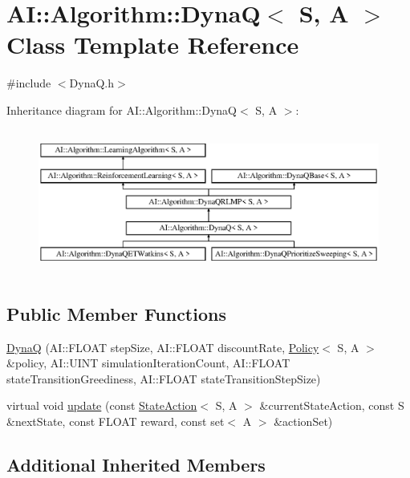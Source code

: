 \hypertarget{classAI_1_1Algorithm_1_1DynaQ}{\section{A\-I\-:\-:Algorithm\-:\-:Dyna\-Q$<$ S, A $>$ Class Template Reference}
\label{classAI_1_1Algorithm_1_1DynaQ}
}


{\ttfamily \#include $<$Dyna\-Q.\-h$>$}

Inheritance diagram for A\-I\-:\-:Algorithm\-:\-:Dyna\-Q$<$ S, A $>$\-:\begin{figure}[H]
\begin{center}
\leavevmode
\includegraphics[height=4.794520cm]{classAI_1_1Algorithm_1_1DynaQ}
\end{center}
\end{figure}
\subsection*{Public Member Functions}
\begin{DoxyCompactItemize}
\item 
\hyperlink{classAI_1_1Algorithm_1_1DynaQ_a7a25f397835208cde0c975733873b76d}{Dyna\-Q} (A\-I\-::\-F\-L\-O\-A\-T step\-Size, A\-I\-::\-F\-L\-O\-A\-T discount\-Rate, \hyperlink{classAI_1_1Algorithm_1_1Policy}{Policy}$<$ S, A $>$ \&policy, A\-I\-::\-U\-I\-N\-T simulation\-Iteration\-Count, A\-I\-::\-F\-L\-O\-A\-T state\-Transition\-Greediness, A\-I\-::\-F\-L\-O\-A\-T state\-Transition\-Step\-Size)
\item 
virtual void \hyperlink{classAI_1_1Algorithm_1_1DynaQ_a4542226b17db4ed8a2c5ec17d37dc42f}{update} (const \hyperlink{classAI_1_1StateAction}{State\-Action}$<$ S, A $>$ \&current\-State\-Action, const S \&next\-State, const F\-L\-O\-A\-T reward, const set$<$ A $>$ \&action\-Set)
\end{DoxyCompactItemize}
\subsection*{Additional Inherited Members}



